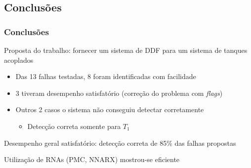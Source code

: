 \documentclass{beamer}
\begin{document}
\subsection*{Conclusões}
\begin{frame}
    \frametitle{Conclusões}

    Proposta do trabalho: fornecer um sistema de DDF para um sistema de tanques
    acoplados

\begin{itemize}
    \item Das 13 falhas testadas, 8 foram identificadas com facilidade
    \item 3 tiveram desempenho satisfatório (correção do problema com {\it
          flags})
    \item Outros 2 casos o sistema não conseguiu detectar corretamente 
    \begin{itemize}
        \item Detecção correta somente para $T_1$
    \end{itemize}
\end{itemize}

    Desempenho geral satisfatório: detecção correta de 85\% das falhas propostas

    \vspace{0.25cm}

    Utilização de RNAs (PMC, NNARX) mostrou-se eficiente

\end{frame}

\end{document}
